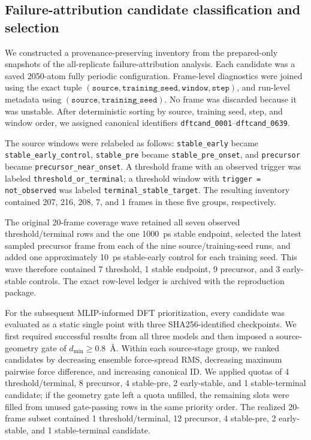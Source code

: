 \subsection{Failure-attribution candidate classification and selection}
\label{sec:si_candidate_selection}

We constructed a provenance-preserving inventory from the prepared-only
snapshots of the all-replicate failure-attribution analysis. Each candidate was
a saved 2050-atom fully periodic configuration. Frame-level diagnostics were
joined using the exact tuple $(\texttt{source},\texttt{training\_seed},
\texttt{window},\texttt{step})$, and run-level metadata using
$(\texttt{source},\texttt{training\_seed})$. No frame was discarded because it
was unstable. After deterministic sorting by source, training seed, step, and
window order, we assigned canonical identifiers
\texttt{dftcand\_0001}--\texttt{dftcand\_0639}.

The source windows were relabeled as follows: \texttt{stable\_early} became
\texttt{stable\_early\_control}, \texttt{stable\_pre} became
\texttt{stable\_pre\_onset}, and \texttt{precursor} became
\texttt{precursor\_near\_onset}. A threshold frame with an observed trigger
was labeled \texttt{threshold\_or\_terminal}; a threshold window with
\texttt{trigger = not\_observed} was labeled
\texttt{terminal\_stable\_target}. The resulting inventory contained 207,
216, 208, 7, and 1 frames in these five groups, respectively.

The original 20-frame coverage wave retained all seven observed
threshold/terminal rows and the one 1000~ps stable endpoint, selected the latest
sampled precursor frame from each of the nine source/training-seed runs, and
added one approximately 10~ps stable-early control for each training seed.
This wave therefore contained 7 threshold, 1 stable endpoint, 9 precursor,
and 3 early-stable controls. The exact row-level ledger is archived with the
reproduction package.

For the subsequent MLIP-informed DFT prioritization, every candidate was
evaluated as a static single point with three SHA256-identified checkpoints.
We first required successful results from all three models and then imposed a
source-geometry gate of $d_{\min}\geq0.8$~\AA. Within each source-stage group,
we ranked candidates by decreasing ensemble force-spread RMS, decreasing
maximum pairwise force difference, and increasing canonical ID. We applied
quotas of 4 threshold/terminal, 8 precursor, 4 stable-pre, 2 early-stable,
and 1 stable-terminal candidate; if the geometry gate left a quota unfilled,
the remaining slots were filled from unused gate-passing rows in the same
priority order. The realized 20-frame subset contained 1 threshold/terminal,
12 precursor, 4 stable-pre, 2 early-stable, and 1 stable-terminal candidate.

